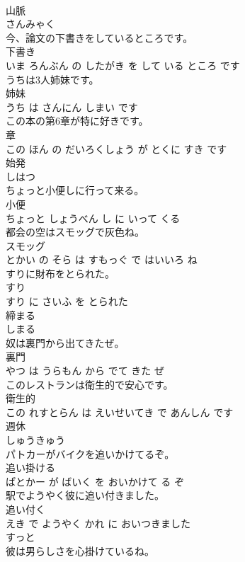 \documentclass[8pt]{extreport}
\begin{document}
\begin{CJK}{UTF8}{min}
\\	山脈	
\\	さんみゃく			
\\	今、論文の下書きをしているところです。	
\\	下書き 
\\	いま ろんぶん の したがき を して いる ところ です			
\\	うちは3人姉妹です。	
\\	姉妹 
\\	うち は さんにん しまい です			
\\	この本の第6章が特に好きです。	
\\	章 
\\	この ほん の だいろくしょう が とくに すき です			
\\	始発	
\\	しはつ			
\\	ちょっと小便しに行って来る。	
\\	小便 
\\	ちょっと しょうべん し に いって くる			
\\	都会の空はスモッグで灰色ね。	
\\	スモッグ 
\\	とかい の そら は すもっぐ で はいいろ ね			
\\	すりに財布をとられた。	
\\	すり 
\\	すり に さいふ を とられた			
\\	締まる	
\\	しまる			
\\	奴は裏門から出てきたぜ。	
\\	裏門 
\\	やつ は うらもん から でて きた ぜ			
\\	このレストランは衛生的で安心です。	
\\	衛生的 
\\	この れすとらん は えいせいてき で あんしん です			
\\	週休	
\\	しゅうきゅう			
\\	パトカーがバイクを追いかけてるぞ。	
\\	追い掛ける 
\\	ぱとかー が ばいく を おいかけて る ぞ			
\\	駅でようやく彼に追い付きました。	
\\	追い付く 
\\	えき で ようやく かれ に おいつきました			
\\	すっと	
\\	彼は男らしさを心掛けているね。	

\end{CJK}
\end{document}
